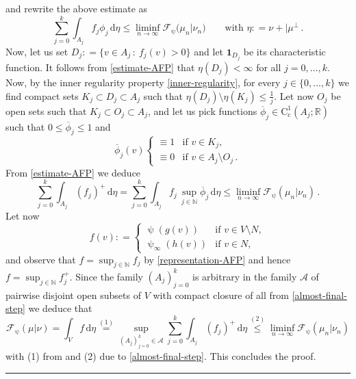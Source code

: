 \documentclass[11pt,reqno]{amsart}
\numberwithin{equation}{section}
\newcommand{\N}{\mathbb{N}}
\newcommand{\R}{\mathbb{R}}
\newcommand{\calF}{\mathcal{F}}
\newcommand{\dd}{\mathrm{d}}
\theoremstyle{definition}
\newcommand{\QED}{\mbox{}\hfill\rule{5pt}{5pt}\medskip\par}
\def\dd{\mathrm{d}}
\def\calF{\mathscr F}
\numberwithin{equation}{section}
\begin{document}
and rewrite the above estimate as 
\begin{equation}
\label{estimate-AFP}
\sum_{j=0}^k \int_{A_j} f_j \phi_j \, \dd \eta \leq 
 \liminf_{n\to\infty}  \calF_\uppsi(\mu_n|\nu_n) \qquad \text{with } \eta: = \nu+|\mu^\perp\,.
\end{equation}
Now, let us set $D_j : = \{ v\in A_j\, : \ f_j(v)>0\}$ and let $\mathbf{1}_{D_j}$ be its characteristic function. It follows from \eqref{estimate-AFP} that 
$\eta(D_j)<\infty$ for all $j=0,\ldots, k$. Now, 
by
the inner regularity property 
\eqref{inner-regularity}, for every $j \in \{0,\ldots, k\}$ we find   compact sets $K_j \subset D_j \subset A_j$ such that  $\eta(D_j) \setminus \eta(K_j) \leq \frac1j $. Let now 
$O_j$ be open sets such that $K_j \subset  O_j \subset A_j$, and let us pick functions $\overline{\phi}_j  \in  \mathrm{C}_{\mathrm{c}}^1(A_j;\R)$ such that 
$0 \leq \overline{\phi}_j  \leq 1$ and 
\[
\overline{\phi}_j(v) \begin{cases}
\equiv 1  & \text{if } v \in K_j,
\\
\equiv 0 & \text{if } v \in A_j \setminus O_j\,.
\end{cases}
\]
From \eqref{estimate-AFP} we deduce 
\begin{equation}
\label{almost-final-step}
\sum_{j=0}^k \int_{A_j} (f_j)^+ \, \dd \eta  = \sum_{j=0}^k \int_{A_j} f_j \, \sup_{j \in \N} \overline{\phi}_j  \, \dd \eta \leq  \liminf_{n\to\infty}  \calF_\uppsi(\mu_n|\nu_n) \,.
\end{equation}
Let now
\[
f(v): =  \begin{cases}
\uppsi(g(v)) & \text{if } v\in V\setminus N,
\\
\uppsi_\infty(h(v)) & \text{if } v \in N,
\end{cases}
\]
and observe  that $f  =\sup_{j\in \N}   f_j  $ by \ref{representation-AFP} and hence $f = \sup_{j\in \N} f_j^+$. Since the family $(A_j)_{j=0}^k$ is arbitrary in the family 
$\mathcal{A}$ of pairwise disjoint open subsets of $V$ with compact closure
of all 
from \eqref{almost-final-step} we deduce  that 
\[
\calF_\uppsi(\mu|\nu) = \int_{V} f \, \dd \eta \stackrel{(1)}= \sup_{(A_j)_{j=0}^k \in \mathcal{A}} \sum_{j=0}^k \int_{A_j} (f_j)^+ \, \dd \eta \stackrel{(2)}\leq  \liminf_{n\to\infty}  \calF_\uppsi(\mu_n|\nu_n) 
\]
with {\footnotesize (1)} from \cite[Lemma 2.35]{AmFuPa05FBVF} and  {\footnotesize (2)}  due to \eqref{almost-final-step}. This concludes the proof. 
\QED

{\small







%

}
\end{document}
